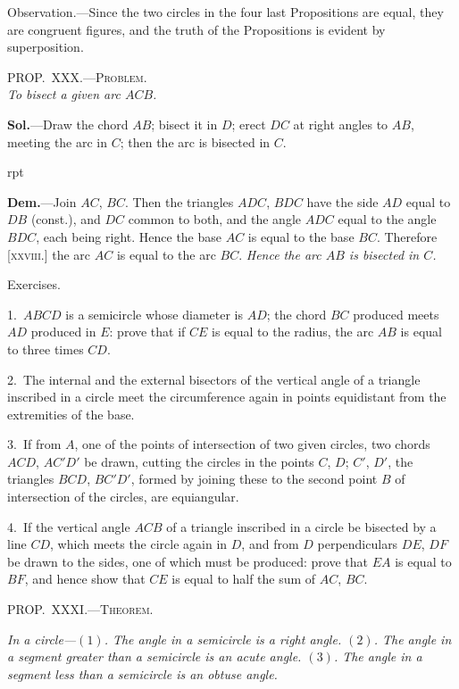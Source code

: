 \documentclass[oneside]{book}
\newcounter{wrapwidth}
\newcommand\myprop[2]{
\bigskip\Needspace*{4\baselineskip}\begin{center}\textsc{#1}\\\medskip\emph{#2}\par\end{center}
}
\newcommand\mypropl[2]{
\bigskip\Needspace*{4\baselineskip}\begin{center}\textsc{#1}\end{center}
\hspace{\parindent}\emph{#2}\par\medskip
}
\newcommand\exhead[1]{
\Needspace*{5\baselineskip}\begin{center}
\textsf{#1}
\end{center}
}
\newcommand\imgflow[3]{
\setcounter{wrapwidth}{#1}

\begin{wrapfigure}[#2]{r}{\value{wrapwidth}pt}
\begin{center}
\vspace{-0.3in}

\end{center}
\end{wrapfigure}
}
\begin{document}
\begin{footnotesize}
\textsf{Observation.}---Since the two circles in the four last Propositions
are equal, they are congruent figures, and the truth of the
Propositions is evident by superposition.
\par\end{footnotesize}

\myprop{PROP\@.~XXX\@.---Problem.}{To bisect a given arc $ACB$.}

\textbf{Sol.}---Draw the chord $AB$; bisect it in $D$; erect $DC$
at right angles to $AB$, meeting the arc in $C$; then the
arc is bisected in $C$.


\imgflow{120}{6}{f136}

\textbf{Dem.}---Join $AC$, $BC$. Then
the triangles $ADC$, $BDC$ have
the side $AD$ equal to $DB$ (const.),
and $DC$ common to both, and
the angle $ADC$ equal to the
angle $BDC$, each being right. Hence the base $AC$ is
equal to the base $BC$. Therefore [\textsc{xxviii.}] the arc $AC$
is equal to the arc $BC$. \emph{Hence the arc $AB$ is bisected
in $C$.}

\exhead{Exercises.}

\begin{footnotesize}
1.~$ABCD$ is a semicircle whose diameter is $AD$; the chord $BC$
produced meets $AD$ produced in $E$: prove that if $CE$ is equal to
the radius, the arc $AB$ is equal to three times $CD$.


2.~The internal and the external bisectors of the vertical angle
of a triangle inscribed in a circle meet the circumference again in
points equidistant from the extremities of the base.

3.~If from $A$, one of the points of intersection of two given
circles, two chords $ACD$, $AC'D'$ be drawn, cutting the circles in
the points $C$, $D$; $C'$, $D'$, the triangles $BCD$, $BC'D'$, formed by
joining these to the second point $B$ of intersection of the circles,
are equiangular.

4.~If the vertical angle $ACB$ of a triangle inscribed in a circle
be bisected by a line $CD$, which meets the circle again in $D$, and
from $D$ perpendiculars $DE$, $DF$ be drawn to the sides, one of
which must be produced: prove that $EA$ is equal to $BF$, and
hence show that $CE$ is equal to half the sum of $AC$, $BC$.
\par\end{footnotesize}


\mypropl{PROP\@.~XXXI\@.---Theorem.}{In a circle---$(1)$. The angle in a semicircle is a right
angle. $(2)$. The angle in a segment greater than a semicircle
is an acute angle. $(3)$. The angle in a segment less
than a semicircle is an obtuse angle.}
\end{document}
